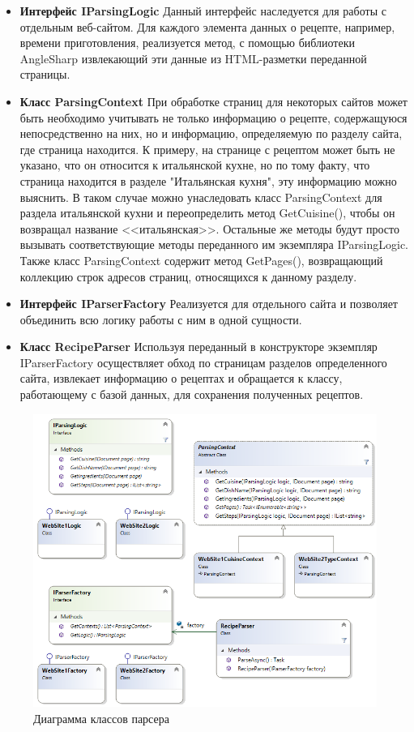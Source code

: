 \documentclass[14pt]{matmex-diploma-custom}
\begin{document}
\begin{itemize}  
\item \textbf{Интерфейс IParsingLogic} Данный интерфейс наследуется для работы с отдельным веб-сайтом. Для каждого элемента данных о рецепте, например, времени приготовления, реализуется метод, с помощью библиотеки AngleSharp извлекающий эти данные из HTML-разметки переданной страницы.
\item \textbf{Класс ParsingContext} При обработке страниц для некоторых сайтов может быть необходимо учитывать не только информацию о рецепте, содержащуюся непосредственно на них, но и информацию, определяемую по разделу сайта, где страница находится. К примеру, на странице с рецептом может быть не указано, что он относится к итальянской кухне, но по тому факту, что страница находится в разделе "Итальянская кухня", эту информацию можно выяснить. В таком случае можно унаследовать класс ParsingContext для раздела итальянской кухни и переопределить метод GetCuisine(), чтобы он возвращал название <<итальянская>>. Остальные же методы будут просто вызывать соответствующие методы переданного им экземпляра IParsingLogic. Также класс ParsingContext содержит метод GetPages(), возвращающий коллекцию строк адресов страниц, относящихся к данному разделу.
\item \textbf{Интерфейс IParserFactory} Реализуется для отдельного сайта и позволяет объединить всю логику работы с ним в одной сущности. 
\item \textbf{Класс RecipeParser} Используя переданный в конструкторе экземпляр IParserFactory осуществляет обход по страницам разделов определенного сайта, извлекает информацию о рецептах и обращается к классу, работающему с базой данных, для сохранения полученных рецептов.

\end{itemize}

\begin{figure}[h]
\centering
\includegraphics[width=\textwidth]{parser.png}
\caption{Диаграмма классов парсера}
\label{parser}
\end{figure}
\end{document}
